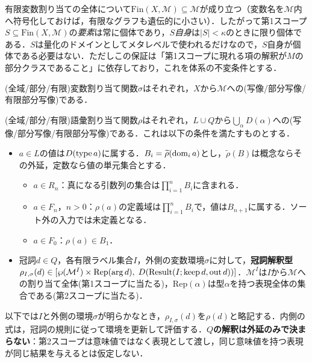 \documentclass[../../main-detail.tex]{subfiles}
\begin{document}
\begin{remark}
    有限変数割り当ての全体について$\mathrm{Fin}(X, \mathcal{M}) \subseteq \mathcal{M}$が成り立つ（変数名を$\mathcal M$内へ符号化しておけば，有限なグラフも遺伝的に小さい）．したがって第1スコープ$S \subseteq \mathrm{Fin}(X,\mathcal{M})$の\emph{要素}は常に個体であり，$S$\emph{自身}は$|S| < \kappa$のときに限り個体である．$S$は量化のドメインとしてメタレベルで使われるだけなので，$S$自身が個体である必要はない．ただしこの保証は「第1スコープに現れる項の解釈が$M$の部分クラスであること」に依存しており，これを体系の不変条件とする．
\end{remark}
\begin{definition}[変数割り当て関数]
    (全域/部分/有限)変数割り当て関数$\sigma$はそれぞれ，$X$から$\mathcal{M}$への(写像/部分写像/有限部分写像)である．
\end{definition}
\begin{definition}[語彙割り当て関数]
    (全域/部分/有限)語彙割り当て関数$\rho$はそれぞれ，$L \cup Q$から$\bigcup_{\alpha} D(\alpha)$への(写像/部分写像/有限部分写像)である．これは以下の条件を満たすものとする．
    \begin{itemize}
        \item $a\in L$の値は$D(\mathop{\mathrm{type}} a)$に属する．$B_i=\widetilde\rho(\mathop{\mathrm{dom}}\nolimits_i a)$とし，$\widetilde\rho(B)$は概念ならその外延，定数なら値の単元集合とする．
        \begin{itemize}
            \item $a\in R_n$：真になる引数列の集合は$\prod_{i=1}^n B_i$に含まれる．
            \item $a\in F_n$，$n>0$：$\rho(a)$の定義域は$\prod_{i=1}^n B_i$で，値は$B_{n+1}$に属する．ソート外の入力では未定義となる．
            \item $a\in F_0$：$\rho(a)\in B_1$．
        \end{itemize}
        \item 冠詞$d\in Q$，各有限ラベル集合$I$，外側の変数環境$\sigma$に対して，\textbf{冠詞解釈型}$\rho_{I,\sigma}(d) \in [\wp(\mathcal{M}^I) \times \mathrm{Rep}(\mathrm{arg}\,d),\; D(\mathrm{Result}(I;\mathrm{keep}\,d,\mathrm{out}\,d))]$．$\mathcal{M}^I$は$I$から$\mathcal{M}$への割り当て全体(第1スコープに当たる)，$\mathrm{Rep}(\alpha)$は型$\alpha$を持つ表現全体の集合である(第2スコープに当たる)．
    \end{itemize}
\end{definition}
\begin{remark}
    以下では$I$と外側の環境$\sigma$が明らかなとき，$\rho_{I,\sigma}(d)$を$\rho(d)$と略記する．内側の式は，冠詞の規則に従って環境を更新して評価する．\textbf{$Q$の解釈は外延のみで決まらない}：第2スコープは意味値ではなく表現として渡し，同じ意味値を持つ表現が同じ結果を与えるとは仮定しない．
\end{remark}
\end{document}
